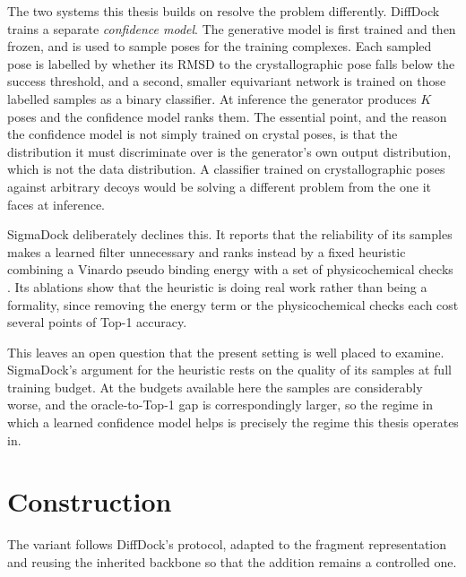 \documentclass[11pt,a4paper]{report}
\theoremstyle{plain}
\theoremstyle{definition}
\theoremstyle{remark}
\begin{document}
The two systems this thesis builds on resolve the problem differently.
DiffDock \citep{corso2023diffdock} trains a separate \emph{confidence model}.
The generative model is first trained and then frozen, and is used to sample
poses for the training complexes. Each sampled pose is labelled by whether its
RMSD to the crystallographic pose falls below the success threshold, and a
second, smaller equivariant network is trained on those labelled samples as a
binary classifier. At inference the generator produces $K$ poses and the
confidence model ranks them. The essential point, and the reason the confidence
model is not simply trained on crystal poses, is that the distribution it must
discriminate over is the generator's own output distribution, which is not the
data distribution. A classifier trained on crystallographic poses against
arbitrary decoys would be solving a different problem from the one it faces at
inference.

SigmaDock deliberately declines this. It reports that the reliability of its
samples makes a learned filter unnecessary and ranks instead by a fixed
heuristic combining a Vinardo pseudo binding energy
\citep{quiroga2016vinardo} with a set of physicochemical checks
\citep{prat2026sigmadock}. Its ablations show that the heuristic is doing real
work rather than being a formality, since removing the energy term or the
physicochemical checks each cost several points of Top-1 accuracy.

This leaves an open question that the present setting is well placed to
examine. SigmaDock's argument for the heuristic rests on the quality of its
samples at full training budget. At the budgets available here the samples are
considerably worse, and the oracle-to-Top-1 gap is correspondingly larger, so
the regime in which a learned confidence model helps is precisely the regime
this thesis operates in.

\section{Construction}

The variant follows DiffDock's protocol, adapted to the fragment
representation and reusing the inherited backbone so that the addition remains
a controlled one.
\end{document}
